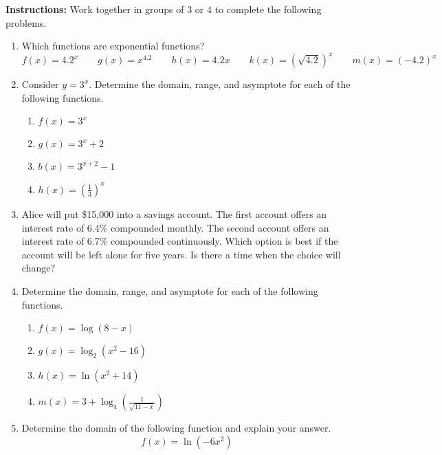 


\noindent \textbf{Instructions:}  Work together in groups of  3 or 4 to complete the following problems.



\begin{enumerate}

\item Which functions are exponential functions?
$$f(x)=4.2^x \quad \quad g(x)=x^{4.2} \quad \quad h(x)=4.2x \quad \quad k(x)=(\sqrt{4.2})^x \quad \quad m(x)=(-4.2)^x$$

\item Consider $y=3^x$.  Determine the domain, range, and asymptote for each of the following functions.

\begin{enumerate}
\item $f(x)=3^x$\vfill
\item $g(x)=3^x+2$\vfill
\item $b(x)=3^{x+2}-1$\vfill


\item  $\displaystyle h(x)=\left(\frac{1}{3}\right)^x$
\vfill


\end{enumerate}

\item Alice will put \$15,000 into a savings account.  The first
  account offers an interest rate of 6.4\% compounded monthly. The
  second account offers an interest rate of 6.7\% compounded
  continuously.  Which option is best if the account will be left
  alone for five years. Is there a time when the choice will change?

\vfill
\vfill

\clearpage

\item Determine the domain, range, and asymptote for each of the following functions.
\begin{enumerate}
\item $f(x)=\log(8-x)$ 
\vfill
\item $g(x)=\log_2 (x^2-16)$ 
\vfill
\vfill
\item $h(x)=\ln(x^2+14)$
\vfill
\item $\displaystyle m(x)=3+\log_4\left(\frac{1}{\sqrt{11-x}}\right)$
\vfill
\end{enumerate}

\item Determine the domain of the following function and explain your answer. $$f(x)=\ln(-6x^2)$$
\vfill
\clearpage


\end{enumerate}
